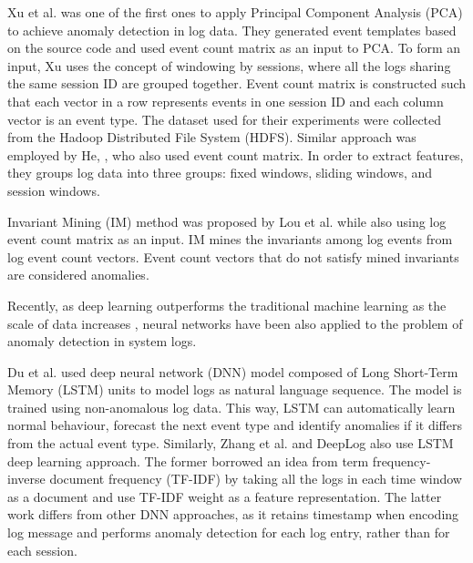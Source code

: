 Xu et al. \cite{xu2009} was one of the first ones to apply Principal Component Analysis (PCA) to achieve anomaly detection in log data. They generated event templates based on the source code and used event count matrix as an input to PCA. To form an input, Xu uses the concept of windowing by sessions, where all the logs sharing the same session ID are grouped together. Event count matrix is constructed such that each vector in a row represents events in one session ID and each column vector is an event type. The dataset used for their experiments were collected from the Hadoop Distributed File System (HDFS).
Similar approach was employed by He, \cite{he2016}, who also used event count matrix. In order to extract features, they groups log data into three groups: fixed windows, sliding windows, and session windows. 

Invariant Mining (IM) method was proposed by Lou et al. \cite{lou2010} while also using log event count matrix as an input. IM mines the invariants among log events from log event count vectors. Event count vectors that do not satisfy mined invariants are considered anomalies. 

Recently, as deep learning outperforms the traditional machine learning as the scale of data increases \cite{Sydney2019DeepLF}, neural networks have been also applied to the problem of anomaly detection in system logs. 

Du et al. \cite{duLSTM2017} used deep neural network (DNN) model composed of Long Short-Term Memory (LSTM) units to model logs as natural language sequence. The model is trained using non-anomalous log data. This way, LSTM can automatically learn normal behaviour, forecast the next event type and identify anomalies if it differs from the actual event type. Similarly, Zhang et al. \cite{zhang2016} and DeepLog \cite{deeplog2017} also use LSTM deep learning approach. The former borrowed an idea from term frequency-inverse document frequency (TF-IDF) by taking all the logs in each time window as a document and use TF-IDF weight as a feature representation. The latter work differs from other DNN approaches, as it retains timestamp when encoding log message and performs anomaly detection for each log entry, rather than for each session.
